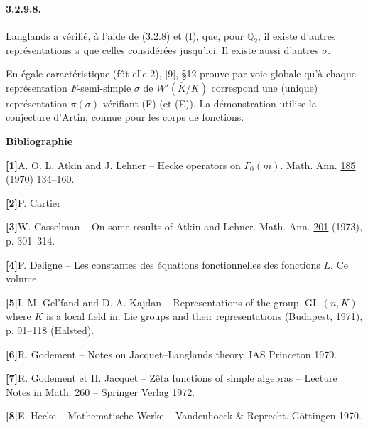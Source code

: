 \documentclass[10pt,a4paper]{article}
\providecommand{\GL}{\operatorname{GL}}
\providecommand{\Q}{\mathbb Q}
\begin{document}
\paragraph{3.2.9.8.} Langlands a vérifié, à l'aide de (3.2.8) et (I), que, pour \(\Q_2\), il existe d'autres représentations \(\pi\) que celles considérées jusqu'ici. Il existe aussi d'autres \(\sigma\).

En égale caractéristique (fût-elle \(2\)), [9], §12 prouve par voie globale qu'à chaque représentation \(F\)-semi-simple \(\sigma\) de \(W'(\overline K/K)\) correspond une (unique) représentation \(\pi(\sigma)\) vérifiant (F) (et (E)). La démonstration utilise la conjecture d'Artin, connue pour les corps de fonctions.

\clearpage
{}
\hypertarget{authority-51}{}
\begin{center}
\textbf{Bibliographie}
\end{center}

\noindent\textbf{[1]}\quad A. O. L. Atkin and J. Lehner -- Hecke operators on \(\Gamma_0(m)\). Math. Ann. \underline{185} (1970) 134--160.\par\medskip

\noindent\textbf{[2]}\quad P. Cartier\par\medskip

\noindent\textbf{[3]}\quad W. Casselman -- On some results of Atkin and Lehner. Math. Ann. \underline{201} (1973), p. 301--314.\par\medskip

\noindent\textbf{[4]}\quad P. Deligne -- Les constantes des équations fonctionnelles des fonctions \(L\). Ce volume.\par\medskip

\noindent\textbf{[5]}\quad I. M. Gel'fand and D. A. Kajdan -- Representations of the group \(\GL(n,K)\) where \(K\) is a local field in: Lie groups and their representations (Budapest, 1971), p. 91--118 (Halsted).\par\medskip

\noindent\textbf{[6]}\quad R. Godement -- Notes on Jacquet--Langlands theory. IAS Princeton 1970.\par\medskip

\noindent\textbf{[7]}\quad R. Godement et H. Jacquet -- Zêta functions of simple algebras -- Lecture Notes in Math. \underline{260} -- Springer Verlag 1972.\par\medskip

\noindent\textbf{[8]}\quad E. Hecke -- Mathematische Werke -- Vandenhoeck \& Reprecht. Göttingen 1970.\par\medskip
\end{document}
